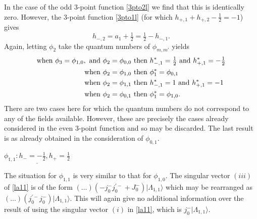 \documentclass[a4paper,12pt]{article}
\def\hf          {\tfrac{1}{2}}
\begin{document}
In the case of the odd 3-point function \eqref{3pto2l} we find
that this is identically zero.  However, the 3-point function
\eqref{3pto1l} (for which $h_{+,1}+h_{+,2}-\hf=-1$) gives
\begin{equation}
h_{-,2}=a_1+\hf = \hf -h_{-,1}.
\end{equation} 
Again, letting $\phi_2$ take the quantum numbers of $\phi_{m,m'}$ yields
\begin{align}
\textrm{when } \phi_3=\phi_{1,0},\textrm{ and }&\phi_2=\phi_{0,0}
\textrm{ then } h^*_{-,1}=\hf \textrm{ and }h^*_{+,1}=-\hf\notag\\
\textrm{ when }&\phi_2=\phi_{1,0} \textrm{ then } \phi^*_1=\phi_{0,1}\notag\\
\textrm{ when }&\phi_2=\phi_{1,1} \textrm{ then }  h^*_{-,1}=1
\textrm{ and } h^*_{+,1}=-1\notag\\ 
\textrm{ when } &\phi_2=\phi_{0,1} \textrm{ then } \phi^*_1=\phi_{1,0}.
\end{align}
There are two cases here for which the quantum numbers do not
correspond to any of the fields available.  However, these are
precisely the cases already considered in the even 3-point function
and so may be discarded.  The last result is as already obtained in
the consideration of $\phi_{0,1}$.



$\underline{\phi_{1,1}: h_-=-\hf,h_+=\hf}$

The situation for $\phi_{1,1}$ is very similar to that for
$\phi_{1,0}$.  The singular vector $(iii)$ of \eqref{la11} is of the
form $(\dots)(-j_0^-j_0^{'-}+J_0^-)|\Lambda_{1,1}\rangle$ which may be
rearranged as $(\dots)(j_0^{'-}j_0^-)|\Lambda_{1,1}\rangle$.  This will
again give no additional information over the result of using the
singular vector $(i)$ in \eqref{la11}, which is
$j_0^-|\Lambda_{1,1}\rangle$.  
\end{document}
